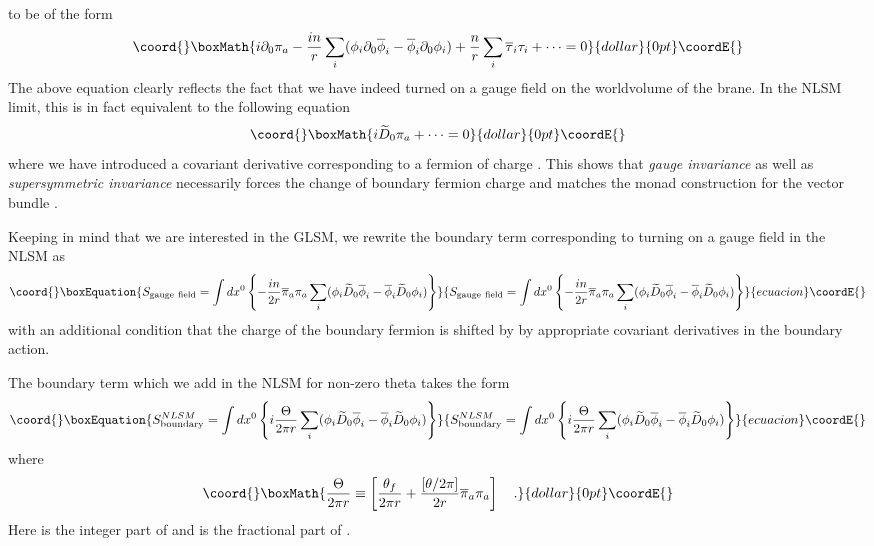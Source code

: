 \documentclass[a4paper,12pt]{article}
\begin{document}
to be of the form
$$\coord{}\boxMath{
i\partial_0 \pi_a -{{in}\over{ r}}\sum_i (\phi_i
\partial_0\overline{\phi}_i - \overline{\phi}_i
\partial_0 \phi_i) + {n\over{r}} \sum_i\overline{\tau}_i\tau_i + \cdots
=0
}{dollar}{0pt}\coordE{}$$
The above equation clearly reflects the fact that we have indeed turned
on a gauge field on the worldvolume of the brane. In the NLSM limit,
this is in fact equivalent to  the following equation
$$\coord{}\boxMath{
i\widetilde{D}_0 \pi_a + \cdots =0
}{dollar}{0pt}\coordE{}$$
where we have introduced a covariant derivative corresponding to
a fermion of charge \coordHE{}. This shows that {\em gauge invariance} as well
as {\em supersymmetric invariance} necessarily  forces the change of
boundary fermion charge and matches the monad construction for
the vector bundle \coordHE{}.

Keeping in mind that we are interested in the GLSM, we rewrite
the boundary term corresponding to turning on a gauge field
in the NLSM as
\begin{equation}\coord{}\boxEquation{
S_{\rm gauge~field}= \int dx^0\left\{ 
-{{in}\over{2 r}} \overline{\pi}_a \pi_a
\sum_i (\phi_i \widetilde{D}_0\overline{\phi}_i - \overline{\phi}_i
\widetilde{D}_0 \phi_i)
\right\}
}{
S_{\rm gauge~field}= \int dx^0\left\{ 
-{{in}\over{2 r}} \overline{\pi}_a \pi_a
\sum_i (\phi_i \widetilde{D}_0\overline{\phi}_i - \overline{\phi}_i
\widetilde{D}_0 \phi_i)
\right\}
}{ecuacion}\coordE{}\end{equation}
with an additional condition that the charge of the boundary fermion
is shifted by \coordHE{} by appropriate covariant derivatives in the boundary
action.

The boundary term which we add in the NLSM for non-zero theta takes the
form
\begin{equation}\coord{}\boxEquation{
S^{NLSM}_{\rm boundary}= \int dx^0\left\{  i{\Theta\over{2\pi r}}
\sum_i (\phi_i \widetilde{D}_0\overline{\phi}_i - \overline{\phi}_i
\widetilde{D}_0 \phi_i)
\right\}
}{
S^{NLSM}_{\rm boundary}= \int dx^0\left\{  i{\Theta\over{2\pi r}}
\sum_i (\phi_i \widetilde{D}_0\overline{\phi}_i - \overline{\phi}_i
\widetilde{D}_0 \phi_i)
\right\}
}{ecuacion}\coordE{}\end{equation}
where 
$$\coord{}\boxMath{
{\Theta\over{2\pi r}}\equiv \left[{{\theta_f}\over{2\pi r}} 
+{{[\theta/2\pi]}\over{2 r}} \overline{\pi}_a \pi_a\right]\quad.
}{dollar}{0pt}\coordE{}$$
Here \myHighlight{$[\theta/2\pi]$}\coordHE{} is the integer part of \myHighlight{$\theta/2\pi$}\coordHE{} and
\coordHE{} is the fractional part of \myHighlight{$\theta/2\pi$}\coordHE{}.
\end{document}
